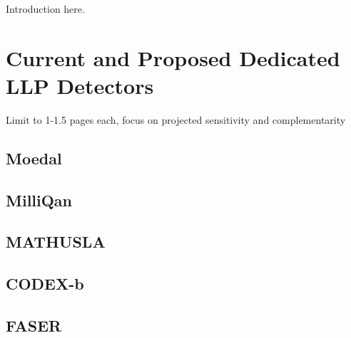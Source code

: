 

Introduction here.





\section{Current and Proposed Dedicated LLP Detectors}

Limit to 1-1.5 pages each, focus on projected sensitivity and complementarity

\subsection{Moedal}
\subsection{MilliQan}
\subsection{MATHUSLA}
\subsection{CODEX-b}
\subsection{FASER}
